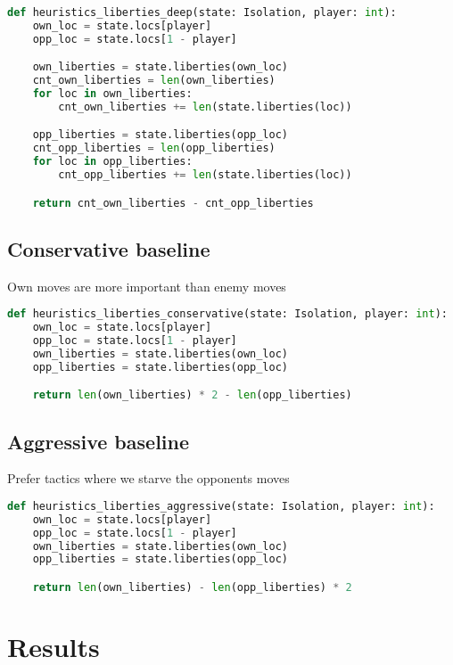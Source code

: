 \documentclass[aps,prd,notitlepage,floatfix,superscriptaddress,groupedaddress,nofootinbib]{revtex4-1}
\begin{document}
\begin{lstlisting}[language=python]
def heuristics_liberties_deep(state: Isolation, player: int):
    own_loc = state.locs[player]
    opp_loc = state.locs[1 - player]

    own_liberties = state.liberties(own_loc)
    cnt_own_liberties = len(own_liberties)
    for loc in own_liberties:
        cnt_own_liberties += len(state.liberties(loc))

    opp_liberties = state.liberties(opp_loc)
    cnt_opp_liberties = len(opp_liberties)
    for loc in opp_liberties:
        cnt_opp_liberties += len(state.liberties(loc))

    return cnt_own_liberties - cnt_opp_liberties
\end{lstlisting}

\subsection*{Conservative baseline}
Own moves are more important than enemy moves

\begin{lstlisting}[language=python]
def heuristics_liberties_conservative(state: Isolation, player: int):
    own_loc = state.locs[player]
    opp_loc = state.locs[1 - player]
    own_liberties = state.liberties(own_loc)
    opp_liberties = state.liberties(opp_loc)

    return len(own_liberties) * 2 - len(opp_liberties)
\end{lstlisting}

\subsection*{Aggressive baseline}
Prefer tactics where we starve the opponents moves

\begin{lstlisting}[language=python]
def heuristics_liberties_aggressive(state: Isolation, player: int):
    own_loc = state.locs[player]
    opp_loc = state.locs[1 - player]
    own_liberties = state.liberties(own_loc)
    opp_liberties = state.liberties(opp_loc)

    return len(own_liberties) - len(opp_liberties) * 2
\end{lstlisting}

\section{Results}
\end{document}
